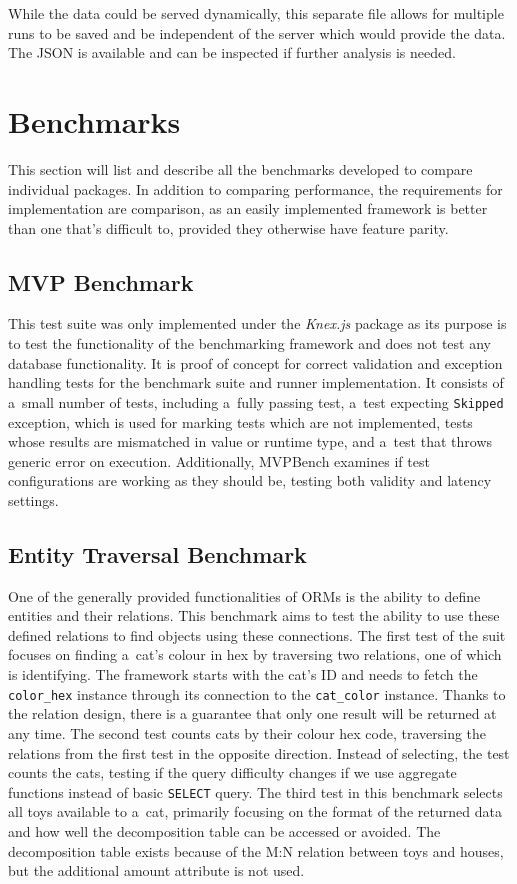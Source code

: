 While the data could be served dynamically, this separate file allows for
multiple runs to be saved and be independent of the server which would provide
the data. The JSON is available and can be inspected if further analysis is
needed.

\section{Benchmarks}
This section will list and describe all the benchmarks developed to compare
individual packages. In addition to comparing performance, the requirements for
implementation are comparison, as an easily implemented framework is better than
one that's difficult to, provided they otherwise have feature parity.

\subsection*{MVP Benchmark}
This test suite was only implemented under the \textit{Knex.js} package as its
purpose is to test the functionality of the benchmarking framework and does not
test any database functionality. It is proof of concept for correct validation
and exception handling tests for the benchmark suite and runner implementation.
It consists of a~small number of tests, including a~fully passing test, a~test
expecting \texttt{Skipped} exception, which is used for marking tests which are
not implemented, tests whose results are mismatched in value or runtime type,
and a~test that throws generic error on execution. Additionally, MVPBench
examines if test configurations are working as they should be, testing both
validity and latency settings.

\subsection*{Entity Traversal Benchmark}
One of the generally provided functionalities of ORMs is the ability to define
entities and their relations. This benchmark aims to test the ability to use
these defined relations to find objects using these connections. The first test
of the suit focuses on finding a~cat's colour in hex by traversing two
relations, one of which is identifying. The framework starts with the cat's ID
and needs to fetch the \texttt{color\_hex} instance through its connection to
the \texttt{cat\_color} instance. Thanks to the relation design, there is a
guarantee that only one result will be returned at any time. The second test
counts cats by their colour hex code, traversing the relations from the first
test in the opposite direction. Instead of selecting, the test counts the cats,
testing if the query difficulty changes if we use aggregate functions instead of
basic \texttt{SELECT} query. The third test in this benchmark selects all toys
available to a~cat, primarily focusing on the format of the returned data and
how well the decomposition table can be accessed or avoided. The decomposition
table exists because of the M:N relation between toys and houses, but the
additional amount attribute is not used.


